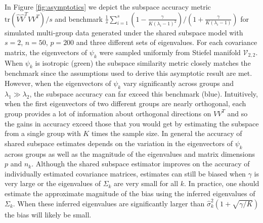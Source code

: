 \documentclass[12pt]{article}
\newcommand{\tr}{\text{tr}}
\begin{document}
In Figure \ref{fig:asymptotics} we depict the subspace accuracy metric
$\tr(\hat{V}\hat{V}^TVV^T)/s$ and benchmark
$\frac{1}{s}\sum_{i=1}^s \left(1-\frac{\gamma}{K(\lambda_i -
    1)^2}\right) /\left(1 + \frac{\gamma}{K(\lambda_i - 1)}\right)$
for simulated multi-group data generated under the shared subspace
model with $s=2$, $n=50$, $p=200$ and three different sets of eigenvalues.  For each
covariance matrix, the eigenvectors of $\psi_k$ were sampled uniformly
from Stiefel manifold $\mathcal{V}_{2,2}$.  When $\psi_k$ is isotropic
(green) the subspace similarity metric closely matches the benchmark
since the assumptions used to derive this asymptotic result are met.
However, when the eigenvectors of $\psi_k$ vary significantly across
groups and $\lambda_1 \gg \lambda_2$, the subspace accuracy can far
exceed this benchmark (blue).  Intuitively, when the first
eigenvectors of two different groups are nearly orthogonal, each group
provides a lot of information about orthogonal directions on $VV^T$
and so the gains in accuracy exceed those that you would get by
estimating the subspace from a single group with $K$ times the sample
size.  In general the accuracy of shared subspace estimates depends on
the variation in the eigenvectors of $\psi_k$ across groups as well as
the magnitude of the eigenvalues and matrix dimensions $p$ and $n_k$.
Although the shared subspace estimator improves on the accuracy of
individually estimated covariance matrices, estimates can still be
biased when $\gamma$ is very large or the eigenvalues of $\Sigma_k$
are very small for all $k$.  In practice, one should estimate the
approximate magnitude of the bias using the inferred eigenvalues of $\Sigma_k$.  When
these inferred eigenvalues are significantly larger than
$\hat{\sigma}_k^2(1+\sqrt{\gamma/K})$ the bias will likely be small.



\end{document}
